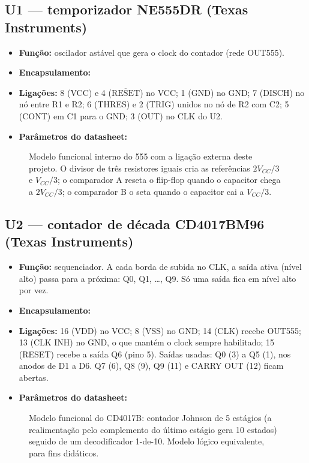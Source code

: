 \documentclass[11pt,a4paper]{article}
\begin{document}
\subsection{U1 — temporizador NE555DR (Texas Instruments)}
\begin{itemize}
  \item \textbf{Função:} oscilador astável que gera o clock do contador (rede OUT555).
  \item \textbf{Encapsulamento:} \DSneEnc
  \item \textbf{Ligações:} 8 (VCC) e 4 ($\overline{\text{RESET}}$) no VCC; 1 (GND) no
  GND; 7 (DISCH) no nó entre R1 e R2; 6 (THRES) e 2 (TRIG) unidos no nó de R2 com C2;
  5 (CONT) em C1 para o GND; 3 (OUT) no CLK do U2.
  \item \textbf{Parâmetros do datasheet:} \DSne
\end{itemize}

\begin{figure}[H]
\centering
\neInterno
\caption{Modelo funcional interno do 555 com a ligação externa deste projeto. O
divisor de três resistores iguais cria as referências $2V_{CC}/3$ e $V_{CC}/3$; o
comparador A reseta o flip-flop quando o capacitor chega a $2V_{CC}/3$; o comparador B o
seta quando o capacitor cai a $V_{CC}/3$.}
\label{fig:ne555int}
\end{figure}

\subsection{U2 — contador de década CD4017BM96 (Texas Instruments)}
\begin{itemize}
  \item \textbf{Função:} sequenciador. A cada borda de subida no CLK, a saída ativa
  (nível alto) passa para a próxima: Q0, Q1, \dots, Q9. Só uma saída fica em nível alto
  por vez.
  \item \textbf{Encapsulamento:} \DScdEnc
  \item \textbf{Ligações:} 16 (VDD) no VCC; 8 (VSS) no GND; 14 (CLK) recebe OUT555;
  13 (CLK INH) no GND, o que mantém o clock sempre habilitado; 15 (RESET) recebe a
  saída Q6 (pino 5). Saídas usadas: Q0 (3) a Q5 (1), nos anodos de D1 a D6. Q7 (6),
  Q8 (9), Q9 (11) e CARRY OUT (12) ficam abertas.
  \item \textbf{Parâmetros do datasheet:} \DScd
\end{itemize}

\begin{figure}[H]
\centering
\resizebox{\linewidth}{!}{\cdInterno}
\caption{Modelo funcional do CD4017B: contador Johnson de 5 estágios (a realimentação
pelo complemento do último estágio gera 10 estados) seguido de um decodificador
1-de-10. Modelo lógico equivalente, para fins didáticos.}
\label{fig:cd4017int}
\end{figure}
\end{document}
